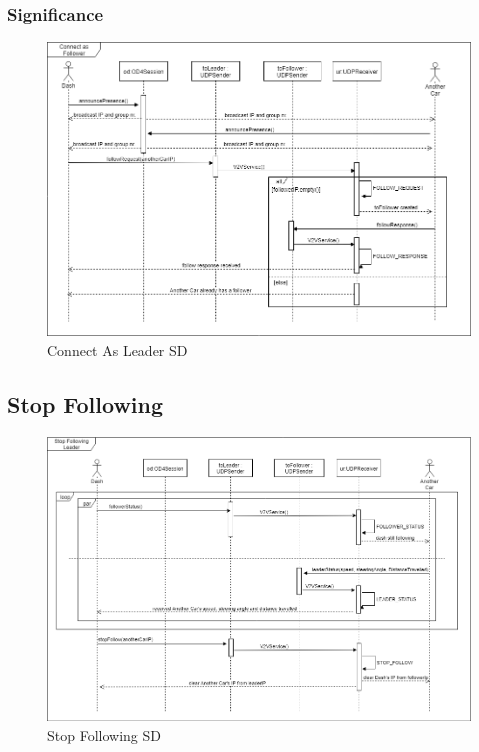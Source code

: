 \documentclass[12pt]{article}
\begin{document}
\subsubsection{Significance}
\FloatBarrier %
\begin{figure}
\centering
\includegraphics[width=\linewidth]{Diagrams/ConnectAsLeader.png}
\caption{Connect As Leader SD}
\label{fig:stopfollowing}
\end{figure}
\FloatBarrier %

\subsection{Stop Following}

\FloatBarrier %
\begin{figure}
\centering
\includegraphics[width=\linewidth]{Diagrams/StopFollowing.png}
\caption{Stop Following SD}
\label{fig:connectasleader}
\end{figure}
\FloatBarrier %
\end{document}
